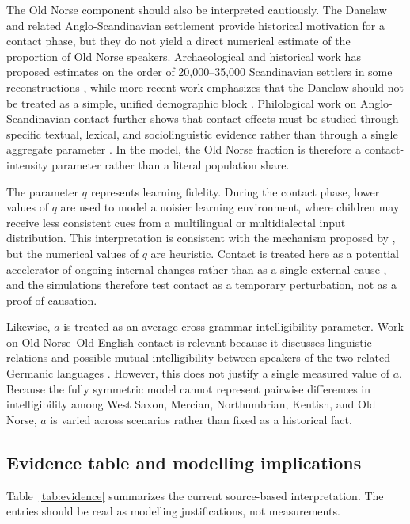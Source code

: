 \documentclass[11pt]{article}
\begin{document}
The Old Norse component should also be interpreted cautiously. The Danelaw and related Anglo-Scandinavian settlement provide historical motivation for a contact phase, but they do not yield a direct numerical estimate of the proportion of Old Norse speakers. Archaeological and historical work has proposed estimates on the order of 20,000--35,000 Scandinavian settlers in some reconstructions \citep{kershawroyvik2016people}, while more recent work emphasizes that the Danelaw should not be treated as a simple, unified demographic block \citep{raffield2020danelaw}. Philological work on Anglo-Scandinavian contact further shows that contact effects must be studied through specific textual, lexical, and sociolinguistic evidence rather than through a single aggregate parameter \citep{townend2002language,pons-sanz2013lexical}. In the model, the Old Norse fraction is therefore a contact-intensity parameter rather than a literal population share.

The parameter $q$ represents learning fidelity. During the contact phase, lower values of $q$ are used to model a noisier learning environment, where children may receive less consistent cues from a multilingual or multidialectal input distribution. This interpretation is consistent with the mechanism proposed by \citet{mitchener2003bifurcation}, but the numerical values of $q$ are heuristic. Contact is treated here as a potential accelerator of ongoing internal changes rather than as a single external cause \citep{dawson2003defining,warner2017english}, and the simulations therefore test contact as a temporary perturbation, not as a proof of causation.

Likewise, $a$ is treated as an average cross-grammar intelligibility parameter. Work on Old Norse--Old English contact is relevant because it discusses linguistic relations and possible mutual intelligibility between speakers of the two related Germanic languages \citep{townend2002language}. However, this does not justify a single measured value of $a$. Because the fully symmetric model cannot represent pairwise differences in intelligibility among West Saxon, Mercian, Northumbrian, Kentish, and Old Norse, $a$ is varied across scenarios rather than fixed as a historical fact.

\subsection{Evidence table and modelling implications}

Table~\ref{tab:evidence} summarizes the current source-based interpretation. The entries should be read as modelling justifications, not measurements.
\end{document}
